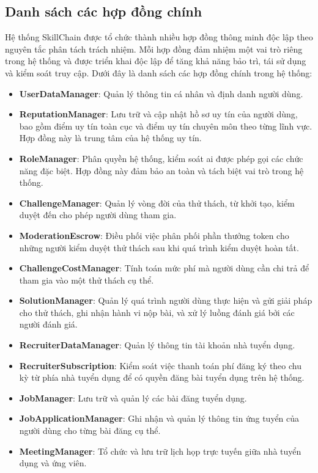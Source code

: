 \subsection{Danh sách các hợp đồng chính}

Hệ thống SkillChain được tổ chức thành nhiều hợp đồng thông minh độc lập theo nguyên tắc phân tách trách nhiệm. Mỗi hợp đồng đảm nhiệm một vai trò riêng trong hệ thống và được triển khai độc lập để tăng khả năng bảo trì, tái sử dụng và kiểm soát truy cập. Dưới đây là danh sách các hợp đồng chính trong hệ thống:

\begin{itemize}
  \item \textbf{UserDataManager}: Quản lý thông tin cá nhân và định danh người dùng.
  \item \textbf{ReputationManager}: Lưu trữ và cập nhật hồ sơ uy tín của người dùng, bao gồm điểm uy tín toàn cục và điểm uy tín chuyên môn theo từng lĩnh vực. Hợp đồng này là trung tâm của hệ thống uy tín.
  \item \textbf{RoleManager}: Phân quyền hệ thống, kiểm soát ai được phép gọi các chức năng đặc biệt. Hợp đồng này đảm bảo an toàn và tách biệt vai trò trong hệ thống.
  \item \textbf{ChallengeManager}: Quản lý vòng đời của thử thách, từ khởi tạo, kiểm duyệt đến cho phép người dùng tham gia.
  \item \textbf{ModerationEscrow}: Điều phối việc phân phối phần thưởng token cho những người kiểm duyệt thử thách sau khi quá trình kiểm duyệt hoàn tất.
  \item \textbf{ChallengeCostManager}: Tính toán mức phí mà người dùng cần chi trả để tham gia vào một thử thách cụ thể.
  \item \textbf{SolutionManager}: Quản lý quá trình người dùng thực hiện và gửi giải pháp cho thử thách, ghi nhận hành vi nộp bài, và xử lý luồng đánh giá bởi các người đánh giá.
  \item \textbf{RecruiterDataManager}: Quản lý thông tin tài khoản nhà tuyển dụng.
  \item \textbf{RecruiterSubscription}: Kiểm soát việc thanh toán phí đăng ký theo chu kỳ từ phía nhà tuyển dụng để có quyền đăng bài tuyển dụng trên hệ thống.
  \item \textbf{JobManager}: Lưu trữ và quản lý các bài đăng tuyển dụng.
  \item \textbf{JobApplicationManager}: Ghi nhận và quản lý thông tin ứng tuyển của người dùng cho từng bài đăng cụ thể.
  \item \textbf{MeetingManager}: Tổ chức và lưu trữ lịch họp trực tuyến giữa nhà tuyển dụng và ứng viên.
\end{itemize}

